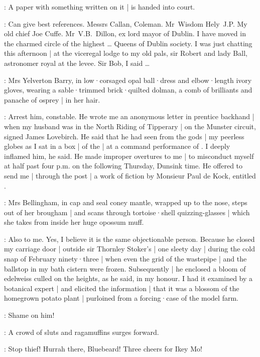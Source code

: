 :
A paper with something written on it |
is handed into court.

\Bloom:
Can give best references.
Messrs Callan,
Coleman.
Mr~Wisdom Hely~J.P.
My old chief Joe Cuffe.
Mr~V.B.~Dillon,
ex lord mayor of Dublin.
I have moved in the charmed circle of the highest \ldots
Queens of Dublin society.
I was just chatting this afternoon |
at the viceregal lodge to my old pals,
sir Robert and lady Ball,
astronomer royal at the levee.
Sir Bob,
I said \ldots

:
Mrs Yelverton Barry,
in low·corsaged opal ball·dress and elbow·length ivory gloves,
wearing a sable·trimmed brick·quilted dolman,
a comb of brilliants and panache of osprey |
in her hair.

\Yelverton:
Arrest him,
constable.
He wrote me an anonymous letter in prentice backhand |
when my husband was in the North Riding of Tipperary |
on the Munster circuit,
signed James Lovebirch.
He said that he had seen from the gods |
my peerless globes as I sat in a box |
of the  |
at a command performance of .
I deeply inflamed him,
he said.
He made improper overtures to me |
to misconduct myself at half past four p.m.
on the following Thursday,
Dunsink time.
He offered to send me |
through the post |
a work of fiction by Monsieur Paul de Kock,
entitled .

:
Mrs Bellingham,
in cap and seal coney mantle,
wrapped up to the nose,
steps out of her brougham |
and scans through tortoise·shell quizzing-glasses |
which she takes from inside her huge opossum muff.

\Bellingham:
Also to me.
Yes,
I believe it is the same objectionable person.
Because he closed my carriage door |
outside sir Thornley Stoker's |
one sleety day |
during the cold snap of February ninety·three |
when even the grid of the wastepipe |
and the ballstop in my bath cistern were frozen.
Subsequently |
he enclosed a bloom of edelweiss culled on the heights,
as he said,
in my honour.
I had it examined by a botanical expert |
and elicited the information |
that it was a blossom of the homegrown potato plant |
purloined from a forcing·case of the model farm.

\Yelverton:
Shame on him!

:
A crowd of sluts and ragamuffins surges forward.

\Ragamuffins:
Stop thief!
Hurrah there,
Bluebeard!
Three cheers for Ikey Mo!


